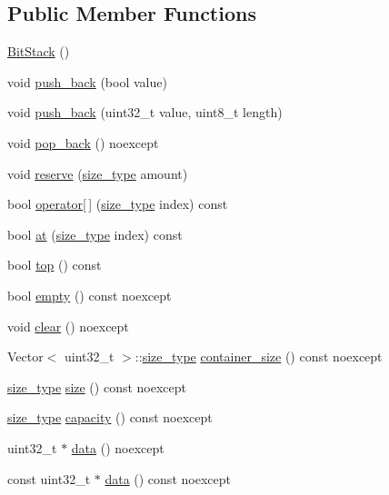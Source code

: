 \subsection*{Public Member Functions}
\begin{DoxyCompactItemize}
\item 
\hyperlink{classcommon_1_1BitStack_a83f7b486f331be745248aed1ec9364dc}{Bit\+Stack} ()
\item 
void \hyperlink{classcommon_1_1BitStack_a737771641c4db9bde300c7d5dc9a8441}{push\+\_\+back} (bool value)
\item 
void \hyperlink{classcommon_1_1BitStack_af60c2f933ee1611608895627a0ed18aa}{push\+\_\+back} (uint32\+\_\+t value, uint8\+\_\+t length)
\item 
void \hyperlink{classcommon_1_1BitStack_ab08e0113d282540f02ca08418b3a836d}{pop\+\_\+back} () noexcept
\item 
void \hyperlink{classcommon_1_1BitStack_af06daa8a793db638c175ce63d1eaf87a}{reserve} (\hyperlink{classcommon_1_1BitStack_a058742dc4b8474a7896e6ce27878f306}{size\+\_\+type} amount)
\item 
bool \hyperlink{classcommon_1_1BitStack_ac7a29aaf6738d1a6610a390c0529e911}{operator\mbox{[}$\,$\mbox{]}} (\hyperlink{classcommon_1_1BitStack_a058742dc4b8474a7896e6ce27878f306}{size\+\_\+type} index) const 
\item 
bool \hyperlink{classcommon_1_1BitStack_a038373df3ee2c1e81a9b9611184d9824}{at} (\hyperlink{classcommon_1_1BitStack_a058742dc4b8474a7896e6ce27878f306}{size\+\_\+type} index) const 
\item 
bool \hyperlink{classcommon_1_1BitStack_acf297b6ccb4213a1b1c9a01e2b253ee7}{top} () const 
\item 
bool \hyperlink{classcommon_1_1BitStack_a188d0ebee826c00d900db99ffc3c8e7a}{empty} () const noexcept
\item 
void \hyperlink{classcommon_1_1BitStack_a6bee6c6d8600a9ebef0eef56ec938b1d}{clear} () noexcept
\item 
Vector$<$ uint32\+\_\+t $>$\+::\hyperlink{classcommon_1_1BitStack_a058742dc4b8474a7896e6ce27878f306}{size\+\_\+type} \hyperlink{classcommon_1_1BitStack_ae9c4073dbca4c587a1ec9ae07b61d062}{container\+\_\+size} () const noexcept
\item 
\hyperlink{classcommon_1_1BitStack_a058742dc4b8474a7896e6ce27878f306}{size\+\_\+type} \hyperlink{classcommon_1_1BitStack_ae6c6288d46a78231ebe544f56be07f62}{size} () const noexcept
\item 
\hyperlink{classcommon_1_1BitStack_a058742dc4b8474a7896e6ce27878f306}{size\+\_\+type} \hyperlink{classcommon_1_1BitStack_a5f3f0ddfd5ffd8fec560d9e51169eb51}{capacity} () const noexcept
\item 
uint32\+\_\+t $\ast$ \hyperlink{classcommon_1_1BitStack_abe5eab2e2d3e83bd26f8082c0b03730a}{data} () noexcept
\item 
const uint32\+\_\+t $\ast$ \hyperlink{classcommon_1_1BitStack_aa2ab95aeba4a83cfb1d3cb160e63cc5e}{data} () const noexcept
\end{DoxyCompactItemize}


